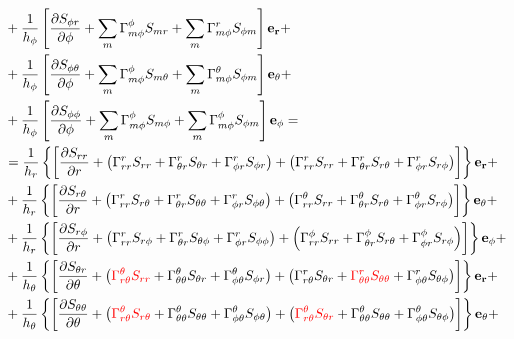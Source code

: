 \documentclass[11pt]{article}
\begin{document}
\begin{align}
& + \frac{1}{h_\phi} \left[ \frac{\partial S_{\phi r}}{\partial \phi} + \sum_m \Gamma_{m\phi}^\phi S_{mr} + \sum_m \Gamma_{m\phi}^r S_{\phi m} \right]{\bf{e_r}} + \\
& + \frac{1}{h_\phi} \left[ \frac{\partial S_{\phi \theta}}{\partial \phi} + \sum_m \Gamma_{m\phi}^\phi S_{m\theta} + \sum_m \Gamma_{m\phi}^\theta S_{\phi m} \right]{\bf{e_\theta}} + \\
& + \frac{1}{h_\phi} \left[ \frac{\partial S_{\phi \phi}}{\partial \phi} + \sum_m \Gamma_{m\phi}^\phi S_{m\phi} + \sum_m \Gamma_{m\phi}^\phi S_{\phi m} \right]{\bf{e_\phi}} = \\
& = \frac{1}{h_r} \left\{ \left[ \frac{\partial S_{rr}}{\partial r} + \left(\Gamma_{rr}^r S_{rr} + \Gamma_{\theta r}^r S_{\theta r} + \Gamma_{\phi r}^r S_{\phi r} \right) + \left(\Gamma_{rr}^r S_{rr} + \Gamma_{\theta r}^r S_{r\theta} + \Gamma_{\phi r}^r S_{r \phi} \right) \right] \right\}{\bf{e_r}} + \\
& + \frac{1}{h_r} \left\{ \left[ \frac{\partial S_{r\theta}}{\partial r} + \left(\Gamma_{rr}^r S_{r\theta} + \Gamma_{\theta r}^r S_{\theta \theta} + \Gamma_{\phi r}^r S_{\phi \theta} \right) + \left(\Gamma_{rr}^\theta S_{rr} + \Gamma_{\theta r}^\theta S_{r\theta} + \Gamma_{\phi r}^\theta S_{r \phi} \right) \right] \right\}{\bf{e_\theta}} + \\
& + \frac{1}{h_r} \left\{ \left[ \frac{\partial S_{r\phi}}{\partial r} + \left(\Gamma_{rr}^r S_{r\phi} + \Gamma_{\theta r}^r S_{\theta \phi} + \Gamma_{\phi r}^r S_{\phi \phi} \right) + \left(\Gamma_{rr}^\phi S_{rr} + \Gamma_{\theta r}^\phi S_{r\theta} + \Gamma_{\phi r}^\phi S_{r \phi} \right) \right] \right\}{\bf{e_\phi}} + \\
& + \frac{1}{h_\theta} \left\{ \left[ \frac{\partial S_{\theta r}}{\partial \theta} + \left( {\color{red}\Gamma_{r\theta}^\theta S_{rr} } + \Gamma_{\theta \theta}^\theta S_{\theta r} + \Gamma_{\phi \theta}^\theta S_{\phi r} \right) + \left(\Gamma_{r\theta}^r S_{\theta r} + {\color{red}\Gamma_{\theta \theta}^r S_{\theta \theta} } + \Gamma_{\phi \theta}^r S_{\theta \phi} \right) \right] \right\}{\bf{e_r}} + \\
& + \frac{1}{h_\theta} \left\{ \left[ \frac{\partial S_{\theta \theta}}{\partial \theta} + \left( {\color{red} \Gamma_{r\theta}^\theta S_{r\theta}} + \Gamma_{\theta \theta}^\theta S_{\theta \theta} + \Gamma_{\phi \theta}^\theta S_{\phi \theta} \right) + \left( {\color{red} \Gamma_{r\theta}^\theta S_{\theta r} } + \Gamma_{\theta \theta}^\theta S_{\theta \theta} + \Gamma_{\phi \theta}^\theta S_{\theta \phi} \right) \right] \right\}{\bf{e_\theta}} + \\

\end{align}
\end{document}
